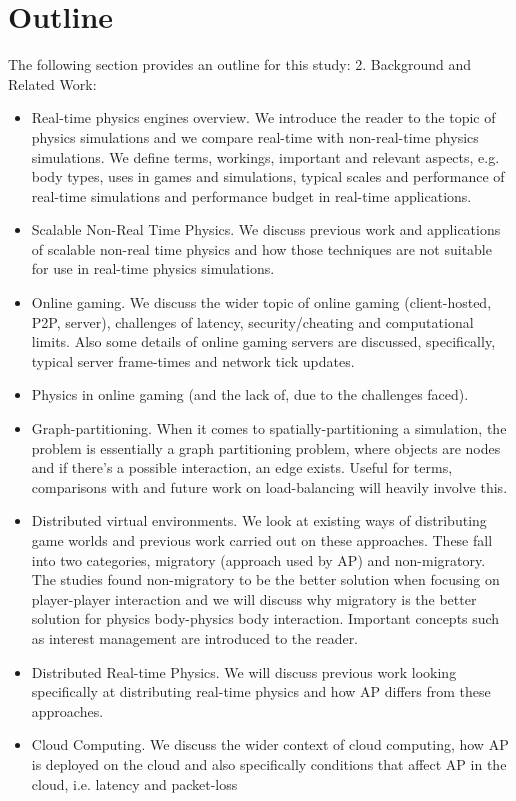 \section{Outline}
The following section provides an outline for this study:
2. Background and Related Work:
\begin{itemize}
	\item Real-time physics engines overview. We introduce the reader to the topic of physics simulations and we compare real-time with non-real-time physics simulations. We define terms, workings, important and relevant aspects, e.g. body types, uses in games and simulations, typical scales and performance of real-time simulations and performance budget in real-time applications.
	\item Scalable Non-Real Time Physics. We discuss previous work and applications of scalable non-real time physics and how those techniques are not suitable for use in real-time physics simulations.
	\item Online gaming. We discuss the wider topic of online gaming (client-hosted, P2P, server), challenges of latency, security/cheating and computational limits. Also some details of online gaming servers are discussed, specifically, typical server frame-times and network tick updates. 
	\item Physics in online gaming (and the lack of, due to the challenges faced).
	\item Graph-partitioning. When it comes to spatially-partitioning a simulation, the problem is essentially a graph partitioning problem, where objects are nodes and if there’s a possible interaction, an edge exists. Useful for terms, comparisons with and future work on load-balancing will heavily involve this.
	\item Distributed virtual environments. We look at existing ways of distributing game worlds and previous work carried out on these approaches. These fall into two categories, migratory (approach used by AP) and non-migratory. The studies found non-migratory to be the better solution when focusing on player-player interaction and we will discuss why migratory is the better solution for physics body-physics body interaction. Important concepts such as interest management are introduced to the reader.
	\item Distributed Real-time Physics. We will discuss previous work looking specifically at distributing real-time physics and how AP differs from these approaches.
	\item Cloud Computing. We discuss the wider context of cloud computing, how AP is deployed on the cloud and also specifically conditions that affect AP in the cloud, i.e. latency and packet-loss

\end{itemize}

